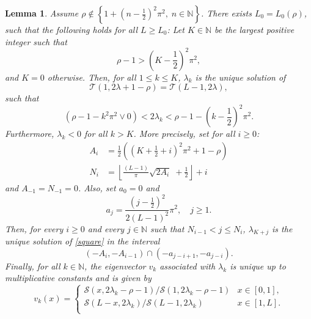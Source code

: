 \documentclass[11pt]{article}
\theoremstyle{plain}
\newtheorem{lemma}{Lemma}[section]
\begin{document}
\begin{lemma} \label{eigenvloc} Assume $\rho\notin\left\{1+\left(n-\frac{1}{2}\right)^2\pi^2, \; n\in\mathbb{N}\right\}$.
There exists $L_0 = L_0(\rho)$, such that the following holds for all $L\ge L_0$: Let $K\in\mathbb{N}$ be the largest positive integer such that
\begin{equation}
\rho-1>\left(K-\frac{1}{2}\right)^2\pi^2,
\label{ik}
\end{equation} and $K=0$ otherwise.
Then, for all $1\leqslant k \leqslant K$, $\lambda_k$ is the unique solution of 
\begin{equation}
    \mathcal{T}\left(1,2\lambda+1-\rho\right)=\mathcal{T}\left(L-1,2\lambda\right),
    \tag{$\square$}
     \label{square}
\end{equation}
such that
\begin{equation}
    (\rho-1-k^2\pi^2\vee 0)<2\lambda_{k}< \rho - 1-\left(k-\frac{1}{2}\right)^2\pi^2. 
    \label{enc}
\end{equation} 
Furthermore, $\lambda_k<0$ for all $k > K$. More precisely, set for all $i\ge0$:
\begin{align}
A_i &= \frac{1}{2}\left(\left(K+\frac{1}{2}+i\right)^2\pi^2+1-\rho\right) \label{def:A}\\
N_i &= \left\lfloor\frac{(L-1)}{\pi}\sqrt{2 A_i} \; +\frac{1}{2}\right\rfloor + i \label{def:N}
\end{align}
and $A_{-1} = N_{-1} = 0$. Also, set $a_0=0$ and
\begin{equation}
a_j=\frac{\left(j-\frac{1}{2}\right)^2}{2(L-1)^2}\pi^2,\quad j\ge 1.
\label{def:aj}
\end{equation}
Then, for every $i\ge0$ and every $j\in \mathbb{N}$ such that $N_{i-1} < j \le N_{i}$,
$\lambda_{K+j}$ is the unique solution of \eqref{square} in the interval
\begin{equation}
(-A_i,-A_{i-1}) \cap (-a_{j-i+1},-a_{j-i}).
    \label{encK}
\end{equation}
Finally, for all $k\in \mathbb{N}$, the eigenvector $v_k$ associated with $\lambda_k$ is unique up to multiplicative constants and is given by 
\begin{equation}
    v_k(x)=
    \begin{cases}
   \mathcal{S}(x,2\lambda_k-\rho-1)/\mathcal{S}(1,2\lambda_k-\rho-1)& x\in [0,1],\\
     \mathcal{S}(L-x,2\lambda_k)/\mathcal{S}(L-1,2\lambda_k) &  x\in[1,L].\\
    \end{cases}
    \label{vecp1}
\end{equation}
\end{lemma}
\end{document}
